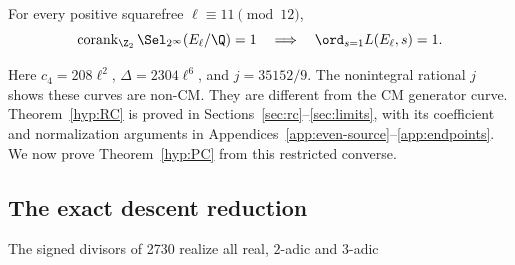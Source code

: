 \begin{theorem}\label{hyp:RC}
For every positive squarefree $\ell\equiv11\pmod{12}$,
\[
 \operatorname{corank}_{\Z_2}\Sel_{2^\infty}(E_\ell/\Q)=1
 \quad\Longrightarrow\quad\ord_{s=1}L(E_\ell,s)=1.
\]
\end{theorem}
Here $c_4=208\ell^2$, $\Delta=2304\ell^6$, and $j=35152/9$.
The nonintegral rational $j$ shows these curves are non-CM. They are
different from the CM generator curve. Theorem~\ref{hyp:RC} is proved in
Sections~\ref{sec:rc}--\ref{sec:limits}, with its coefficient and
normalization arguments in Appendices~\ref{app:even-source}--\ref{app:endpoints}.
We now prove Theorem~\ref{hyp:PC} from this restricted converse.

\subsection{The exact descent reduction}
The signed divisors of 2730 realize all real, $2$-adic and $3$-adic
